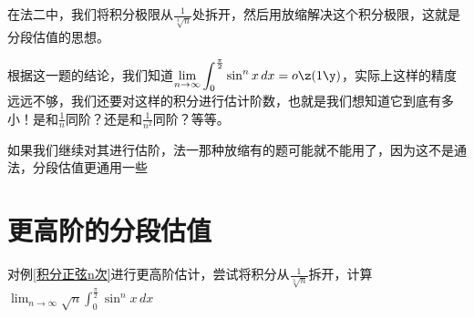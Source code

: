 \begin{remark}
在法二中，我们将积分极限从$\frac{1}{\sqrt[3]{n}}$处拆开，然后用放缩解决这个积分极限，这就是分段估值的思想。

根据这一题的结论，我们知道$\displaystyle \lim_{n \to \infty} \int_{0}^{\frac{\pi}{2}} \sin^{n}x \,dx = o\z(1\y) $，实际上这样的精度远远不够，我们还要对这样的积分进行估计阶数，也就是我们想知道它到底有多小！是和$ \frac{1}{n}$同阶？还是和$\frac{1}{n^2} $同阶？等等。

如果我们继续对其进行估阶，法一那种放缩有的题可能就不能用了，因为这不是通法，分段估值更通用一些
\end{remark}


\section{更高阶的分段估值}

\vspace{1mm}
\begin{example}\label{积分正弦n次高阶}
对例\ref{积分正弦n次}进行更高阶估计，尝试将积分从$\displaystyle \frac{1}{\sqrt[3]{n}}$拆开，计算$ \displaystyle 
\lim_{n \to \infty} \sqrt{n} \int_{0}^{\frac{\pi}{2}} \sin^{n}x \,dx$
\end{example}

